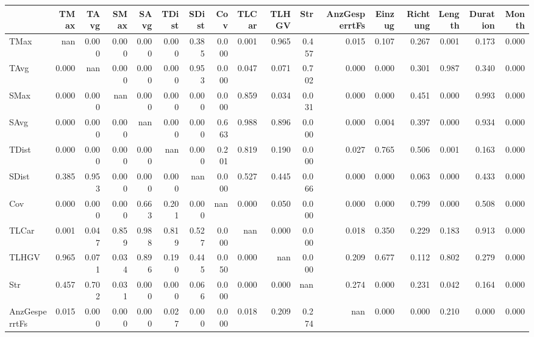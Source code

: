 \begin{tabular}{lrrrrrrrrrrrrrrrr}
\toprule
{} &  TMax &  TAvg &  SMax &  SAvg &  TDist &  SDist &   Cov &  TLCar &  TLHGV &   Str &  AnzGesperrtFs &  Einzug &  Richtung &  Length &  Duration &  Month \\
\midrule
TMax          &   nan & 0.000 & 0.000 & 0.000 &  0.000 &  0.385 & 0.000 &  0.001 &  0.965 & 0.457 &          0.015 &   0.107 &     0.267 &   0.001 &     0.173 &  0.000 \\
TAvg          & 0.000 &   nan & 0.000 & 0.000 &  0.000 &  0.953 & 0.000 &  0.047 &  0.071 & 0.702 &          0.000 &   0.000 &     0.301 &   0.987 &     0.340 &  0.000 \\
SMax          & 0.000 & 0.000 &   nan & 0.000 &  0.000 &  0.000 & 0.000 &  0.859 &  0.034 & 0.031 &          0.000 &   0.000 &     0.451 &   0.000 &     0.993 &  0.000 \\
SAvg          & 0.000 & 0.000 & 0.000 &   nan &  0.000 &  0.000 & 0.663 &  0.988 &  0.896 & 0.000 &          0.000 &   0.004 &     0.397 &   0.000 &     0.934 &  0.000 \\
TDist         & 0.000 & 0.000 & 0.000 & 0.000 &    nan &  0.000 & 0.201 &  0.819 &  0.190 & 0.000 &          0.027 &   0.765 &     0.506 &   0.001 &     0.163 &  0.000 \\
SDist         & 0.385 & 0.953 & 0.000 & 0.000 &  0.000 &    nan & 0.000 &  0.527 &  0.445 & 0.066 &          0.000 &   0.000 &     0.063 &   0.000 &     0.433 &  0.000 \\
Cov           & 0.000 & 0.000 & 0.000 & 0.663 &  0.201 &  0.000 &   nan &  0.000 &  0.050 & 0.000 &          0.000 &   0.000 &     0.799 &   0.000 &     0.508 &  0.000 \\
TLCar         & 0.001 & 0.047 & 0.859 & 0.988 &  0.819 &  0.527 & 0.000 &    nan &  0.000 & 0.000 &          0.018 &   0.350 &     0.229 &   0.183 &     0.913 &  0.000 \\
TLHGV         & 0.965 & 0.071 & 0.034 & 0.896 &  0.190 &  0.445 & 0.050 &  0.000 &    nan & 0.000 &          0.209 &   0.677 &     0.112 &   0.802 &     0.279 &  0.000 \\
Str           & 0.457 & 0.702 & 0.031 & 0.000 &  0.000 &  0.066 & 0.000 &  0.000 &  0.000 &   nan &          0.274 &   0.000 &     0.231 &   0.042 &     0.164 &  0.000 \\
AnzGesperrtFs & 0.015 & 0.000 & 0.000 & 0.000 &  0.027 &  0.000 & 0.000 &  0.018 &  0.209 & 0.274 &            nan &   0.000 &     0.000 &   0.210 &     0.000 &  0.000 \\

\end{tabular}
